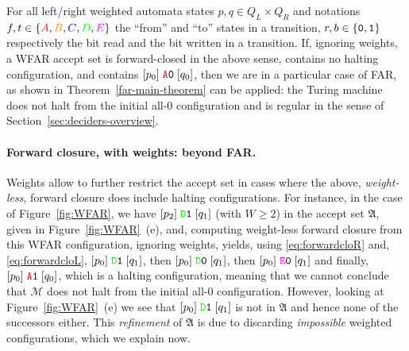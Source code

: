 For all left/right weighted automata states $p,q \in Q_L \times Q_R$ and notations $f,t \in \{\stateA,\stateB,\stateC,\stateD,\stateE\}$ the ``from'' and ``to'' states in a transition, $r,b \in \left\{\texttt{0},\texttt{1}\right\}$ respectively the bit read and the bit written in a transition. If, ignoring weights, a WFAR accept set is forward-closed in the above sense, contains no halting configuration, and contains $[p_0] \; \texttt{\stateA}\szero\; [q_0]$, then we are in a particular case of FAR, as shown in \cite{bbchallenge_part1} \ie Theorem~\ref{far-main-theorem} can be applied: the Turing machine does not halt from the initial all-0 configuration and is regular in the sense of Section~\ref{sec:deciders-overview}.

\paragraph{Forward closure, with weights: beyond FAR.} Weights allow to further restrict the accept set in cases where the above, \textit{weight-less}, forward closure does include halting configurations. For instance, in the case of Figure~\ref{fig:WFAR}, we have $[p_2] \; \texttt{\stateD}\sone \; [q_1]$ (with $W \geq 2$) in the accept set $\mathfrak{A}$, given in Figure~\ref{fig:WFAR}~(e), and, computing weight-less forward closure from this WFAR configuration, ignoring weights, yields, using \eqref{eq:forwardcloR} and, \eqref{eq:forwardcloL}, $[p_0] \; \texttt{\stateD}\sone \; [q_1]$, then $[p_0] \; \texttt{\stateD}\szero \; [q_1]$, then $[p_0] \; \texttt{\stateE}\szero \; [q_1]$ and finally, $[p_0] \; \texttt{\stateA}\sone \; [q_0] $, which is a halting configuration, meaning that we cannot conclude that $\mathcal{M}$ does not halt from the initial all-0 configuration. However, looking at Figure~\ref{fig:WFAR}~(e) we see that $[p_0] \; \texttt{\stateD}\sone \; [q_1]$ is not in $\mathfrak{A}$ and hence none of the successors either. This \textit{refinement} of $\mathfrak{A}$ is due to discarding \textit{impossible} weighted configurations, which we explain now.

